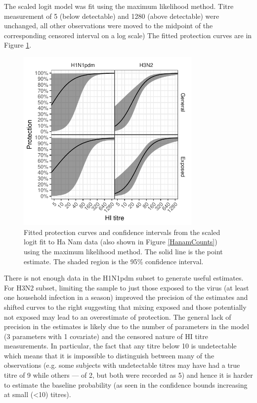 The scaled logit model was fit using the maximum likelihood method. Titre measurement of 5 (below detectable) and 1280 (above detectable) were unchanged, all other observations were moved to the midpoint of the corresponding censored interval on a log scale) The fitted protection curves are in Figure \ref{fig:fit-sclr-prot}.

\begin{figure}[htp]
	\centering
	\includegraphics[width=0.8\textwidth]{../fit-sclr-plot/hanam-hi-prot.pdf}
	\caption{
	Fitted protection curves and confidence intervals from the scaled logit fit to Ha Nam data (also shown in Figure \ref{HanamCounts}) using the maximum likelihood method. The solid line is the point estimate. The shaded region is the 95\% confidence interval.
	}
	\label{fig:fit-sclr-prot}
\end{figure}

There is not enough data in the H1N1pdm subset to generate useful estimates. For H3N2 subset, limiting the sample to just those exposed to the virus (at least one household infection in a season) improved the precision of the estimates and shifted curves to the right suggesting that mixing exposed and those potentially not exposed may lead to an overestimate of protection. The general lack of precision in the estimates is likely due to the number of parameters in the model (3 parameters with 1 covariate) and the censored nature of HI titre measurements. In particular, the fact that any titre below 10 is undetectable which means that it is impossible to distinguish between many of the observations (e.g. some subjects with undetectable titres may have had a true titre of 9 while others --- of 2, but both were recorded as 5) and hence it is harder to estimate the baseline probability (as seen in the confidence bounds increasing at small (<10) titres).
